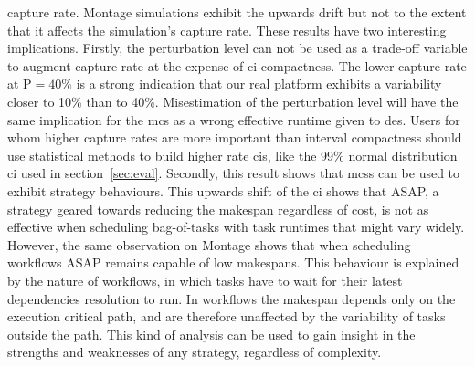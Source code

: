 \documentclass[]{llncs}
\begin{document}
capture rate. Montage simulations exhibit the upwards drift but not to the
extent that it affects the simulation's capture rate. These results have two 
interesting implications.
%
%
Firstly, the perturbation level can
not be used as a trade-off variable to augment capture rate at the expense of
\ac{ci} compactness. The lower capture rate at P$=40\%$ is a
strong indication that our real platform exhibits a variability closer to
10\% than to 40\%. Misestimation of the perturbation level will have the same
implication for the \ac{mcs} as a wrong effective runtime given to \ac{des}. 
Users for whom higher capture rates are more important than
interval compactness should use statistical methods to build higher rate \acp{ci},
like the 99\% normal distribution \ac{ci} used in section~\ref{sec:eval}.
%
Secondly, this result shows that \ac{mcs}s can be used to exhibit strategy
behaviours. This upwards shift of the \ac{ci} shows that ASAP, a strategy
geared towards reducing the makespan regardless of cost, is not as effective
when scheduling bag-of-tasks with task runtimes that might vary widely. However,
the same observation on Montage shows that when scheduling workflows ASAP 
remains capable of low makespans. This behaviour is explained by the nature of 
workflows, in which tasks have to wait for their latest dependencies resolution 
to run. In workflows the makespan depends only on the execution critical path, 
and are therefore unaffected by the variability of tasks outside the path. 
This kind of analysis can be used to gain insight in the strengths and 
weaknesses of any strategy, regardless of complexity.
\end{document}
